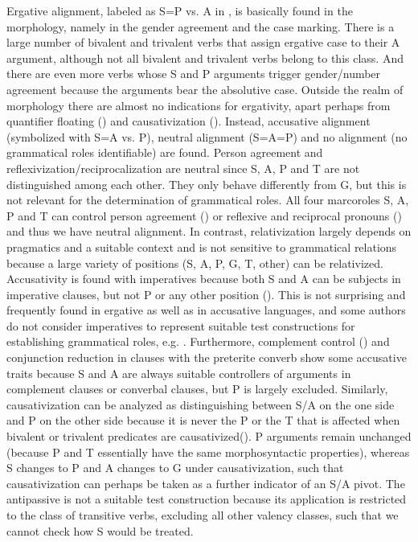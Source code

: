 Ergative alignment, labeled as S=P vs. A in , is basically found in the morphology, namely in the gender agreement and the case marking. There is a large number of bivalent and trivalent verbs that assign ergative case to their A argument, although not all bivalent and trivalent verbs belong to this class. And there are even more verbs whose S and P arguments trigger gender/number agreement because the arguments bear the absolutive case. Outside the realm of morphology there are almost no indications for ergativity, apart perhaps from quantifier floating () and causativization (). Instead, accusative alignment (symbolized with S=A vs. P), neutral alignment (S=A=P) and no alignment (no grammatical roles identifiable) are found. Person agreement and reflexivization\slash reciprocalization are neutral since S, A, P and T are not distinguished among each other. They only behave differently from G, but this is not relevant for the determination of grammatical roles. All four marcoroles S, A, P and T can control person agreement () or reflexive and reciprocal pronouns () and thus we have neutral alignment. In contrast, relativization largely depends on pragmatics and a suitable context and is not sensitive to grammatical relations because a large variety of positions (S, A, P, G, T, other) can be relativized. Accusativity is found with imperatives because both S and A can be subjects in imperative clauses, but not P or any other position (). This is not surprising and frequently found in ergative as well as in accusative languages, and some authors do not consider imperatives to represent suitable test constructions for establishing grammatical roles, e.g. \citet[131]{Dixon1994}. Furthermore, complement control () and conjunction reduction in clauses with the preterite converb show some accusative traits because S and A are always suitable controllers of arguments in complement clauses or converbal clauses, but P is largely excluded. Similarly, causativization can be analyzed as distinguishing between S/A on the one side and P on the other side because it is never the P or the T that is affected when bivalent or trivalent predicates are causativized(). P arguments remain unchanged (because P and T essentially have the same morphosyntactic properties), whereas S changes to P and A changes to G under causativization, such that causativization can perhaps be taken as a further indicator of an S/A pivot. The antipassive is not a suitable test construction because its application is restricted to the class of transitive verbs, excluding all other valency classes, such that we cannot check how S would be treated.

